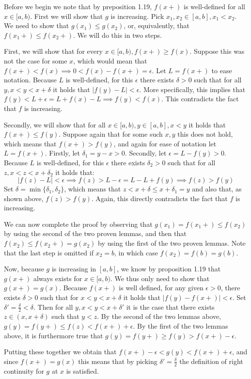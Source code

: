 \begin{solution}

    Before we begin we note that by preposition 1.19, $f(x+)$ is well-defined for all $x \in [a, b)$. 
    First we will show that $g$ is increasing. 
    Pick $x_1, x_2 \in [a, b], x_1 < x_2$. 
    We need to show that $g(x_1) \leq g(x_2)$, or, equivalently, that $f(x_1+) \leq f(x_2+)$.
    We will do this in two steps. 
    
    First, we will show that for every $x \in [a, b), f(x+) \geq f(x)$.
    Suppose this was not the case for some $x$, which would mean that $f(x+) < f(x) \implies 0 < f(x) - f(x+) = \epsilon$. 
    Let $L = f(x+)$ to ease notation. 
    Because $L$ is well-defined, for this $\epsilon$ there exists $\delta > 0$ such that for all $y, x < y < x + \delta$ it holds that $\lvert f(y) - L \rvert < \epsilon$.
    More specifically, this implies that $f(y) < L + \epsilon = L + f(x) - L \implies f(y) < f(x)$.
    This contradicts the fact that $f$ is increasing.

    Secondly, we will show that for all $x \in [a, b), y \in [a, b], x < y$ it holds that $f(x+) \leq f(y)$. 
    Suppose again that for some such $x, y$ this does not hold, which means that $f(x+) > f(y)$, and again for ease of notation let $L = f(x+)$.
    Firstly, let $\delta_1 = y - x > 0$. 
    Secondly, let $\epsilon = L - f(y) > 0$.
    Because $L$ is well-defined, for this $\epsilon$ there exists $\delta_2 > 0$ such that for all $z, x < z < x + \delta_2$ it holds that:
    $$\lvert f(z) - L \rvert < \epsilon \implies f(z) > L - \epsilon = L - L + f(y) \implies f(z) > f(y)$$
    Set $\delta = \min\{\delta_1, \delta_2\}$, which means that $z < x + \delta \leq x + \delta_1 = y$ and also that, as shown above, $f(z) > f(y)$.
    Again, this directly contradicts the fact that $f$ is increasing.

    We can now complete the proof by observing that $g(x_1) = f(x_1+) \leq f(x_2)$ by using the second of the two proven lemmas, and then that $f(x_2) \leq f(x_2+) = g(x_2)$ by using the first of the two proven lemmas. 
    Note that the last step is omitted if $x_2 = b$, in which case $f(x_2) = f(b) = g(b)$.

    Now, because $g$ is increasing in $[a, b]$, we know by proposition 1.19 that $g(x+)$ always exists for $x \in [a, b)$.
    We thus only need to show that $g(x+) = g(x)$. 
    Because $f(x+)$ is well defined, for any given $\epsilon > 0$, there exists $\delta > 0$ such that for $x < y < x + \delta$ it holds that $\lvert f(y) - f(x+) \rvert < \epsilon$. 
    Set $\delta' = \frac{\delta}{2} < \delta$. Then for all $y, x < y < x + \delta'$ it is the case that there exists $z \in (x, x + \delta)$ such that $y < z$.
    By the second of the two lemmas above, $g(y) = f(y+) \leq f(z) < f(x+) + \epsilon$.
    By the first of the two lemmas above, it is furthermore true that $g(y) = f(y+) \geq f(y) > f(x+) - \epsilon$.

    Putting these together we obtain that $f(x+) - \epsilon < g(y) < f(x+) + \epsilon$, and since $f(x+) = g(x)$ this means that by picking $\delta' = \frac{\delta}{2}$ the definition of right continuity for $g$ at $x$ is satisfied.
\end{solution}
